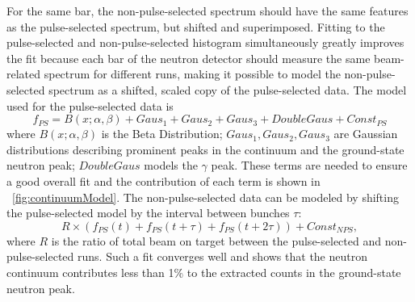For the same bar, the non-pulse-selected spectrum should have the same features as the pulse-selected spectrum, but shifted and superimposed.  Fitting to the pulse-selected and non-pulse-selected histogram simultaneously greatly improves the fit because each bar of the neutron detector should measure the same beam-related spectrum for different runs, making it possible to model the non-pulse-selected spectrum as a shifted, scaled copy of the pulse-selected data.  The model used for the pulse-selected data is
\begin{equation}
f_{PS} = B(x;\alpha,\beta) + Gaus_1 + Gaus_2 + Gaus_3 + DoubleGaus + Const_{PS}
\end{equation}
where $B(x;\alpha,\beta)$ is the Beta Distribution; $Gaus_1, Gaus_2, Gaus_3$ are Gaussian distributions describing prominent peaks in the continuum and the ground-state neutron peak; $DoubleGaus$ models the $\gamma$ peak.  These terms are needed to ensure a good overall fit and the contribution of each term is shown in {\fig}~\ref{fig:continuumModel}.  The non-pulse-selected data can be modeled by shifting the pulse-selected model by the interval between bunches $\tau$:
\begin{equation}
R\times(f_{PS}(t) + f_{PS}(t+\tau) + f_{PS}(t+2\tau)) + Const_{NPS},
\label{eq:NPS_model}
\end{equation}
where $R$ is the ratio of total beam on target between the pulse-selected and non-pulse-selected runs.  Such a fit converges well and shows that the neutron continuum contributes less than 1\% to the extracted counts in the ground-state neutron peak.  
